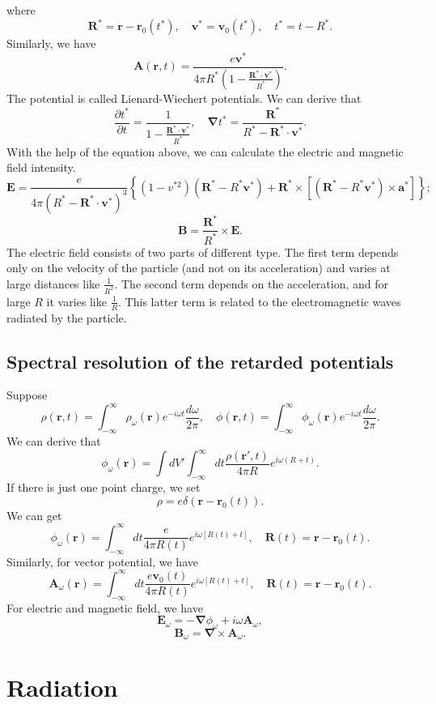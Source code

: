 where 
\[\bm{R}^* = \bm{r} - \bm{r}_0(t^*) , \quad \bm{v}^* = \bm{v}_0(t^*) , \quad t^* = t - R^*.\]
Similarly, we have
\[\bm{A}(\bm{r},t) = \frac{e\bm{v}^*}{4\pi R^* (1 - \frac{\bm{R}^* \cdot \bm{v}^*}{R^*})}.\]
The potential is called Lienard-Wiechert potentials.
We can derive that
\[\frac{\partial t^*}{\partial t} = \frac{1}{1- \frac{\bm{R}^* \cdot \bm{v}^*}{R^*}} , \quad \bm{\nabla} t^* = \frac{\bm{R}^*}{R^* - \bm{R}^* \cdot \bm{v}^*}.\]
With the help of the equation above, we can calculate the electric and magnetic field intensity.
\[\bm{E} = \frac{e}{4\pi(R^* - \bm{R}^* \cdot \bm{v}^*)^3} \left\{ (1-v^{*2})(\bm{R}^* - R^*\bm{v}^*) + \bm{R}^* \times \left[(\bm{R}^* - R^*\bm{v}^*) \times \bm{a}^* \right] \right\};\]
\[\bm{B} = \frac{\bm{R}^*}{R^*} \times \bm{E}.\]
The electric field consists of two parts of different type. The first term depends only on the velocity of the particle (and not on its acceleration) and varies at large distances like $\frac{1}{R^2}$. The second term depends on the acceleration, and for large $R$ it varies like $\frac{1}{R}$. This latter term is related to the electromagnetic waves radiated by the particle.

\subsection{Spectral resolution of the retarded potentials}
Suppose
\[\rho(\bm{r},t) = \int_{-\infty}^{\infty} \rho_{\omega}(\bm{r}) e^{-i\omega t} \frac{d\omega}{2\pi} , \quad \phi(\bm{r},t) = \int_{-\infty}^{\infty} \phi_{\omega}(\bm{r}) e^{-i\omega t} \frac{d\omega}{2\pi}.\]
We can derive that
\[\phi_{\omega}(\bm{r}) = \int dV' \int_{-\infty}^{\infty} dt \frac{\rho(\bm{r}',t)}{4\pi R} e^{i\omega(
R+t)}.\]
If there is just one point charge, we set
\[\rho = e\delta(\bm{r} - \bm{r}_0(t)).\]
We can get
\[\phi_{\omega}(\bm{r}) =  \int_{-\infty}^{\infty} dt \frac{e}{4\pi R(t)} e^{i\omega[
R(t)+t]} , \quad \bm{R}(t) =\bm{r}-\bm{r}_0(t).\]
Similarly, for vector potential, we have
\[\bm{A}_{\omega}(\bm{r}) =  \int_{-\infty}^{\infty} dt \frac{e\bm{v}_0(t)}{4\pi R(t)} e^{i\omega[
R(t)+t]} , \quad \bm{R}(t) =\bm{r}-\bm{r}_0(t).\]
For electric and magnetic field, we have
\[\bm{E}_{\omega} = -\bm{\nabla}\phi_{\omega} + i\omega \bm{A}_{\omega},\]
\[\bm{B}_{\omega} = \bm{\nabla} \times \bm{A}_{\omega}.\]

\section{Radiation}
